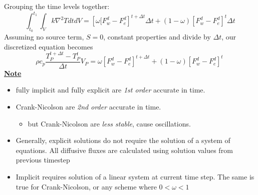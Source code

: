 \documentclass[11pt]{article}
\begin{document}
Grouping the time levels together:
\begin{equation}
 \int_{t_0}^{t_1} \int_{V} k \nabla^2 T dt dV = \left[\omega[F_w^d-F_e^d \right ]^{t+\Delta t}\Delta t +
 (1-\omega)\left [F_w^d - F_e^d \right ]^t\Delta t
\end{equation}
Assuming no source term, \(S = 0\), constant properties and divide by \(\Delta t\), our discretized equation becomes
 \begin{equation}
\rho c_p \frac{T_P^{t+\Delta t} - T_P^t}{\Delta t} V_P = \omega \left[F_w^d-F_e^d \right ]^{t+\Delta t} +
  (1-\omega)\left [F_w^d - F_e^d \right ]^t\
 \end{equation}
\textbf{\uline{Note}}
\begin{itemize}
\item fully implicit and fully explicit are \emph{1st order} accurate in time.
\item Crank-Nicolson are \emph{2nd order} accurate in time.
\begin{itemize}
\item but Crank-Nicolson are \emph{less stable}, cause oscillations.
\end{itemize}
\item Generally, explicit solutions do not require the solution of a system of equations. All diffusive fluxes are calculated using solution values from previous timestep
\item Implicit requires solution of a linear system at current time step. The same is true for Crank-Nicolson, or any scheme where \(0<\omega < 1\)
\end{itemize}
\end{document}
